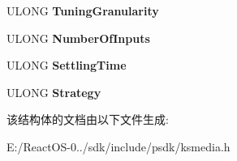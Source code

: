 \begin{DoxyCompactItemize}
U\+L\+O\+NG {\bfseries Tuning\+Granularity}
\item 
\mbox{\label{struct_k_s_p_r_o_p_e_r_t_y___t_u_n_e_r___m_o_d_e___c_a_p_s___s_adcdf880157d7d3b8e48decf045f42aa9}} 
U\+L\+O\+NG {\bfseries Number\+Of\+Inputs}
\item 
\mbox{\label{struct_k_s_p_r_o_p_e_r_t_y___t_u_n_e_r___m_o_d_e___c_a_p_s___s_a54baa8cc18541f0c53371e090d61a2a7}} 
U\+L\+O\+NG {\bfseries Settling\+Time}
\item 
\mbox{\label{struct_k_s_p_r_o_p_e_r_t_y___t_u_n_e_r___m_o_d_e___c_a_p_s___s_a338c79f99dadd9248fb564e0fbce6a00}} 
U\+L\+O\+NG {\bfseries Strategy}
\end{DoxyCompactItemize}


该结构体的文档由以下文件生成\+:\begin{DoxyCompactItemize}
\item 
E\+:/\+React\+O\+S-\/0../sdk/include/psdk/ksmedia.\+h\end{DoxyCompactItemize}
